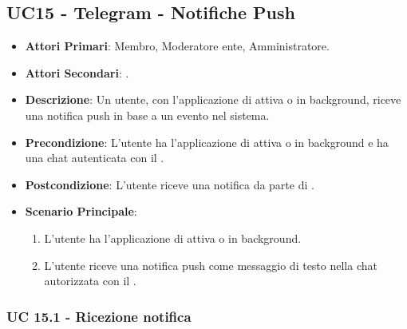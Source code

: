 \subsection{UC15 - Telegram  - Notifiche Push}
		
		
	\begin{itemize}
		\item \textbf{Attori Primari}: Membro, Moderatore ente, Amministratore.
		\item \textbf{Attori Secondari}: .
		\item \textbf{Descrizione}: Un utente, con l'applicazione di  attiva o in background, riceve una notifica push in base a un evento nel sistema. 
		\item \textbf{Precondizione}: L'utente ha l'applicazione di  attiva o in background e ha una chat autenticata con il .
		\item \textbf{Postcondizione}: L'utente riceve una notifica da parte di .
		\item \textbf{Scenario Principale}:
		\begin{enumerate}
			\item L'utente ha l'applicazione di  attiva o in background. 
			\item L'utente riceve una notifica push come messaggio di testo nella chat autorizzata con il .
		\end{enumerate}
	\end{itemize}
	
	\subsubsection{UC 15.1 - Ricezione notifica }

